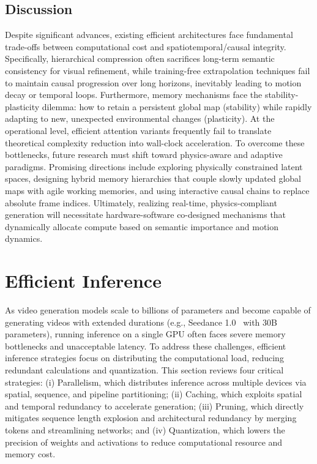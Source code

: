 \documentclass[lettersize,journal]{IEEEtran}
\begin{document}
\subsection{Discussion}
Despite significant advances, existing efficient architectures face fundamental trade-offs between computational cost and spatiotemporal/causal integrity. Specifically, hierarchical compression often sacrifices long-term semantic consistency for visual refinement, while training-free extrapolation techniques fail to maintain causal progression over long horizons, inevitably leading to motion decay or temporal loops. Furthermore, memory mechanisms face the stability-plasticity dilemma: how to retain a persistent global map (stability) while rapidly adapting to new, unexpected environmental changes (plasticity).  At the operational level, efficient attention variants frequently fail to translate theoretical complexity reduction into wall-clock acceleration. To overcome these bottlenecks, future research must shift toward physics-aware and adaptive paradigms. Promising directions include exploring physically constrained latent spaces, designing hybrid memory hierarchies that couple slowly updated global maps with agile working memories, and using interactive causal chains to replace absolute frame indices. Ultimately, realizing real-time, physics-compliant generation will necessitate hardware-software co-designed mechanisms that dynamically allocate compute based on semantic importance and motion dynamics.

\section{Efficient Inference}
\label{sec:efficient_inference}

As video generation models scale to billions of parameters and become capable of generating videos with extended durations (e.g., Seedance 1.0~\cite{gao2025seedance} with 30B parameters), running inference on a single GPU often faces severe memory bottlenecks and unacceptable latency. To address these challenges, 
efficient inference strategies focus on distributing the computational load, reducing redundant calculations and quantization. This section reviews four critical strategies: (i) Parallelism, which distributes inference across multiple devices via spatial, sequence, and pipeline partitioning; (ii) Caching, which exploits spatial and temporal redundancy to accelerate generation; (iii) Pruning, which directly mitigates sequence length explosion and architectural redundancy by merging tokens and streamlining networks; and (iv) Quantization, which lowers the precision of weights and activations to reduce computational resource and memory cost.
\end{document}
